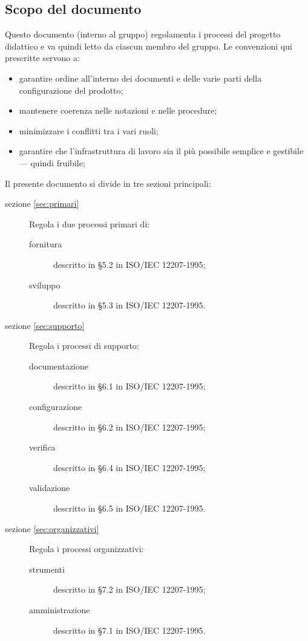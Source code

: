 \subsection{Scopo del documento}
Questo documento (interno al gruppo) regolamenta i processi del progetto didattico e va quindi letto da ciascun membro del gruppo. Le convenzioni qui prescritte servono a:
\begin{itemize}
	\item garantire ordine all'interno dei documenti e delle varie parti della configurazione del prodotto;
	\item mantenere coerenza nelle notazioni e nelle procedure;
	\item minimizzare i conflitti tra i vari ruoli;
	\item garantire che l'infrastruttura di lavoro sia il più possibile semplice e gestibile --- quindi fruibile;
\end{itemize}
Il presente documento si divide in tre sezioni principali:
\begin{description}
	\item[sezione \ref{sec:primari}] Regola i due processi primari di:
	\begin{description}
		\item[fornitura] descritto in §5.2 in ISO/IEC 12207-1995;
		\item[sviluppo] descritto in §5.3 in ISO/IEC 12207-1995.
	\end{description}
	\item[sezione \ref{sec:supporto}] Regola i processi di supporto:
	\begin{description}
		\item[documentazione] descritto in §6.1 in ISO/IEC 12207-1995;
		\item[configurazione] descritto in §6.2 in ISO/IEC 12207-1995;
		\item[verifica] descritto in §6.4 in ISO/IEC 12207-1995;
		\item[validazione] descritto in §6.5 in ISO/IEC 12207-1995.
	\end{description}
	\item[sezione \ref{sec:organizzativi}] Regola i processi organizzativi:
	\begin{description}
		\item[strumenti] descritto in §7.2 in ISO/IEC 12207-1995;
		\item[amministrazione] descritto in §7.1 in ISO/IEC 12207-1995.
	\end{description}
\end{description}

